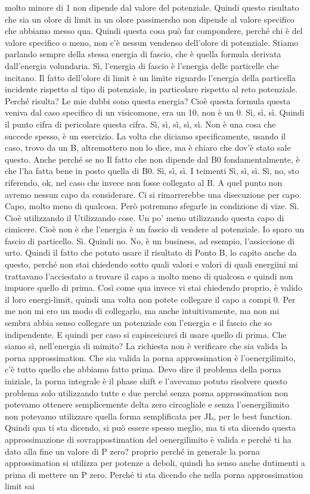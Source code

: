 \begin{soluzione}
{   molto minore di 1 non dipende dal valore del potenziale. Quindi questo risultato che sia un olore di limit in un olore passimersho non dipende al valore specifico che abbiamo messo qua. Quindi questa cosa può far compondere, perché chi è del valore specifico o meno, non c'è nessun vendenso dell'olore di potenziale. Stiamo parlando sempre della stessa energia di fascio, che è quella formula derivata dall'energia volundaria. Sì, l'energia di fascio è l'energia delle particelle che incitano. Il fatto dell'olore di limit è un limite riguardo l'energia della particella incidente rispetto al tipo di potenziale, in particolare rispetto al reto potenziale. Perché risulta? Le mie dubbi sono questa energia? Cioè questa formula questa veniva dal caso specifico di un visicomone, era un 10, non è un 0. Sì, sì, sì. Quindi il punto cifra di pericolare questa cifra. Sì, sì, sì, sì, sì. Non è una cosa che succede spesso, è un esercizio. La volta che diciamo specificamente, usando il caso, trovo da un B, altremottero non lo dice, ma è chiaro che dov'è stato sale questo. Anche perché se no Il fatto che non dipende dal B0 fondamentalmente, è che l'ha fatta bene in posto quella di B0. Sì, sì, sì. I teimenti Sì, sì, sì. Sì, no, sto riferendo, ok, nel caso che invece non fosse collegato al B. A quel punto non avremo nessun capo da considerare. Ci si rimarrerebbe una disecuzione per capo. Capo, molto meno di qualcosa. Però potremmo sfegarle in condizione di vize. Sì. Cioè utilizzando il Utilizzando cose. Un po' meno utilizzando questa capo di cimicere. Cioè non è che l'energia è un fascio di vendere al potenziale. Io sparo un fascio di particello. Sì. Quindi no. No, è un business, ad esempio, l'assiccione di urto. Quindi il fatto che potuto usare il risultato di Ponto B, lo capito anche da questo, perché non stai chiedendo sotto quali valori e valori di quali energiini mi trattavano l'acciestato a trovare il capo a molto meno di qualcosa e quindi non impuore quello di prima. Così come qua invece vi stai chiedendo proprio, è valido il loro energi-limit, quindi una volta non potete collegare il capo a compi 0. Per me non mi ero un modo di collegarlo, ma anche intuitivamente, ma non mi sembra abbia senso collegare un potenziale con l'energia e il fascio che so indipendente. E quindi per caso si capisceicarci di usare quello di prima. Che siamo sì, nell'energia di mimito? La richiesta non è verificare che sia valida la porna approssimation. Che sia valida la porna approssimation è l'oenergilimito, c'è tutto quello che abbiamo fatto prima. Devo dire il problema della porna iniziale, la porna integrale è il phase shift e l'avevamo potuto risolvere questo problema solo utilizzando tutte e due perché senza porna approssimation non potevamo ottenere semplicemente delta zero circogliale e senza l'oenergilimito non potevamo utilizzare quella forma semplificata per JL, per le best function. Quindi qua ti sta dicendo, si può essere spesso meglio, ma ti sta dicendo questa approssimazione di sovrappostimation del oenergilimito è valida e perché ti ha dato alla fine un valore di P zero? proprio perché in generale la porna approssimation si utilizza per potenze a deboli, quindi ha senso anche dutimenti a prima di mettere un P zero. Perché ti sta dicendo che nella porna approssimation limit sai }
\end{soluzione}
